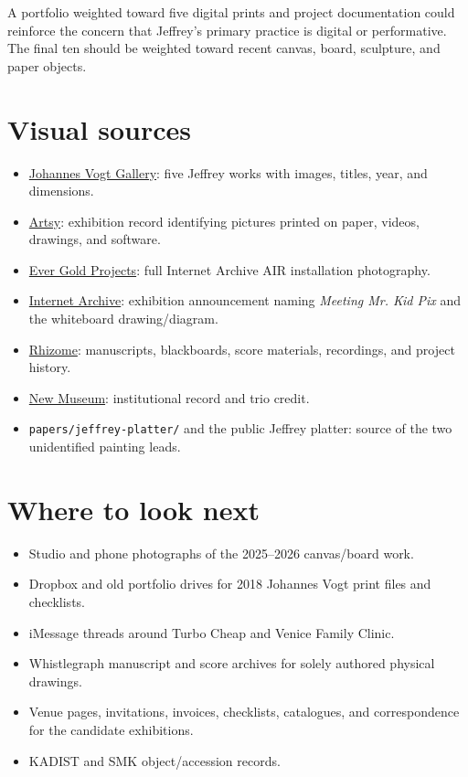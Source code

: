 \documentclass[11pt,letterpaper]{article}
\begin{document}
A portfolio weighted toward five digital prints and project documentation could reinforce the concern that Jeffrey's primary practice is digital or performative. The final ten should be weighted toward recent canvas, board, sculpture, and paper objects.

\section{Visual sources}

\begin{itemize}
\item \href{https://johannesvogt.nyc/jeffrey-scudder-and-julia-yerger-radical-digital-paintings/}{Johannes Vogt Gallery}: five Jeffrey works with images, titles, year, and dimensions.
\item \href{https://www.artsy.net/show/johannes-vogt-gallery-radical-digital-painting}{Artsy}: exhibition record identifying pictures printed on paper, videos, drawings, and software.
\item \href{https://www.evergoldprojects.com/exhibition/the-internet-archives-2019-artist-in-residency-exhibition-june-29-august-17/}{Ever Gold Projects}: full Internet Archive AIR installation photography.
\item \href{https://blog.archive.org/2019/06/}{Internet Archive}: exhibition announcement naming \textit{Meeting Mr. Kid Pix} and the whiteboard drawing/diagram.
\item \href{https://sites.rhizome.org/the-longest-whistlegraph-ever-so-far/about/}{Rhizome}: manuscripts, blackboards, score materials, recordings, and project history.
\item \href{https://www.newmuseum.org/exhibition/first-look-the-longest-whistlegraph-ever-so-far/}{New Museum}: institutional record and trio credit.
\item \texttt{papers/jeffrey-platter/} and the public Jeffrey platter: source of the two unidentified painting leads.
\end{itemize}

\section{Where to look next}

\begin{itemize}
\item Studio and phone photographs of the 2025--2026 canvas/board work.
\item Dropbox and old portfolio drives for 2018 Johannes Vogt print files and checklists.
\item iMessage threads around Turbo Cheap and Venice Family Clinic.
\item Whistlegraph manuscript and score archives for solely authored physical drawings.
\item Venue pages, invitations, invoices, checklists, catalogues, and correspondence for the candidate exhibitions.
\item KADIST and SMK object/accession records.
\end{itemize}
\end{document}
